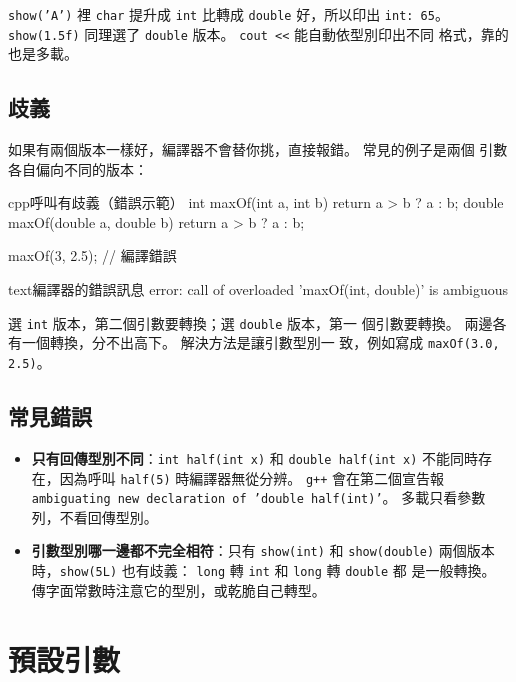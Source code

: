\texttt{show('A')} 裡 \texttt{char} 提升成 \texttt{int} 比轉成
\texttt{double} 好，所以印出 \texttt{int: 65}。 \texttt{show(1.5f)}
同理選了 \texttt{double} 版本。 \texttt{cout <<} 能自動依型別印出不同
格式，靠的也是多載。

\subsection{歧義}

如果有兩個版本一樣好，編譯器不會替你挑，直接報錯。 常見的例子是兩個
引數各自偏向不同的版本：

\begin{code}{cpp}{呼叫有歧義（錯誤示範）}
int maxOf(int a, int b) { return a > b ? a : b; }
double maxOf(double a, double b) { return a > b ? a : b; }

maxOf(3, 2.5);   // 編譯錯誤
\end{code}

\begin{code}{text}{編譯器的錯誤訊息}
error: call of overloaded 'maxOf(int, double)' is ambiguous
\end{code}

選 \texttt{int} 版本，第二個引數要轉換；選 \texttt{double} 版本，第一
個引數要轉換。 兩邊各有一個轉換，分不出高下。 解決方法是讓引數型別一
致，例如寫成 \texttt{maxOf(3.0, 2.5)}。

\subsection{常見錯誤}

\begin{itemize}
\item \textbf{只有回傳型別不同}：\texttt{int half(int x)} 和
\texttt{double half(int x)} 不能同時存在，因為呼叫 \texttt{half(5)}
時編譯器無從分辨。 \texttt{g++} 會在第二個宣告報
\texttt{ambiguating new declaration of 'double half(int)'}。 多載只看參數列，不看回傳型別。
\item \textbf{引數型別哪一邊都不完全相符}：只有 \texttt{show(int)} 和
\texttt{show(double)} 兩個版本時，\texttt{show(5L)} 也有歧義：
\texttt{long} 轉 \texttt{int} 和 \texttt{long} 轉 \texttt{double} 都
是一般轉換。 傳字面常數時注意它的型別，或乾脆自己轉型。
\end{itemize}

\section{預設引數}
\label{sec:default-args}

